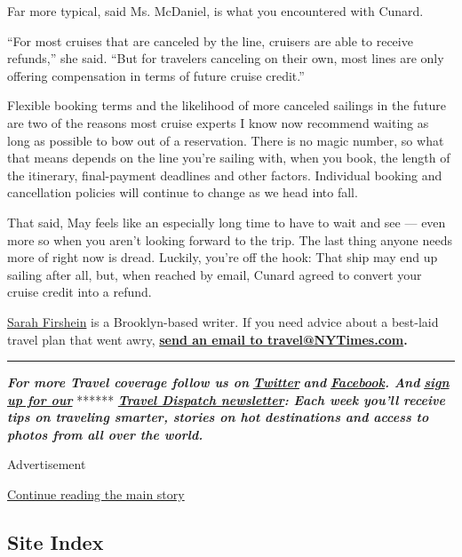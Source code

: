 Far more typical, said Ms. McDaniel, is what you encountered with
Cunard.

``For most cruises that are canceled by the line, cruisers are able to
receive refunds,'' she said. ``But for travelers canceling on their own,
most lines are only offering compensation in terms of future cruise
credit.''

Flexible booking terms and the likelihood of more canceled sailings in
the future are two of the reasons most cruise experts I know now
recommend waiting as long as possible to bow out of a reservation. There
is no magic number, so what that means depends on the line you're
sailing with, when you book, the length of the itinerary, final-payment
deadlines and other factors. Individual booking and cancellation
policies will continue to change as we head into fall.

That said, May feels like an especially long time to have to wait and
see --- even more so when you aren't looking forward to the trip. The
last thing anyone needs more of right now is dread. Luckily, you're off
the hook: That ship may end up sailing after all, but, when reached by
email, Cunard agreed to convert your cruise credit into a refund.

\href{https://twitter.com/sfirshein?lang=en}{Sarah Firshein} is a
Brooklyn-based writer. If you need advice about a best-laid travel plan
that went awry, \textbf{\href{mailto:travel@NYTimes.com}{send an email
to travel@NYTimes.com}.}

\begin{center}\rule{0.5\linewidth}{\linethickness}\end{center}

\emph{\textbf{For more Travel coverage follow us on}}
\textbf{\href{https://twitter.com/nytimestravel}{\emph{Twitter}}}
\emph{\textbf{and}}
\textbf{\href{https://www.facebookcorewwwi.onion/nytimestravel/}{\emph{Facebook}}\emph{.
And}}
\textbf{\href{https://www.nytimes3xbfgragh.onion/newsletters/traveldispatch?action=click\&module=inline\&pgtype=Article}{\emph{sign
up for our}}} ******
\textbf{\href{https://www.nytimes3xbfgragh.onion/newsletters/traveldispatch}{\emph{Travel
Dispatch newsletter}}\emph{: Each week you'll receive tips on traveling
smarter, stories on hot destinations and access to photos from all over
the world.}}

Advertisement

\protect\hyperlink{after-bottom}{Continue reading the main story}

\hypertarget{site-index}{%
\subsection{Site Index}\label{site-index}}

